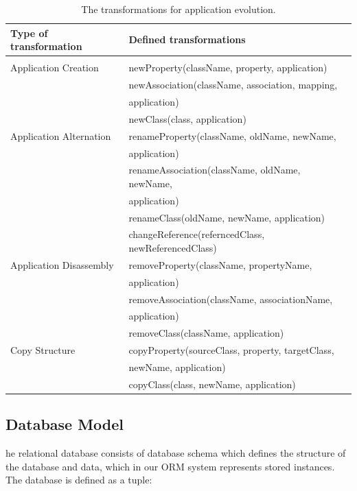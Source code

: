 \documentclass[runningheads]{comsis}
\begin{document}
\begin{table}
\caption{The transformations for application evolution.}
	\label{tab:app-evolution}
\centering
	\begin{tabular}{ll}
	\hline
	Type of transformation & Defined transformations \\
	\hline
	\\[-2ex] 
	Application Creation
	& newProperty(className, property, application) \\
	& newAssociation(className, association, mapping, \\ &  \hspace{0.5in}application) \\
	&  newClass(class, application) \\
	Application Alternation
		& renameProperty(className, oldName, newName, \\ &  \hspace{0.5in} application) \\
		& renameAssociation(className, oldName, newName, \\ &  \hspace{0.5in}application) \\
		& renameClass(oldName, newName, application)\\
		& changeReference(referncedClass, newReferencedClass) \\
	Application Disassembly 
		& removeProperty(className, propertyName,\\ &  \hspace{0.5in} application) \\
		& removeAssociation(className, associationName, \\ &  \hspace{0.5in}application) \\
		& removeClass(className, application)\\
	Copy Structure
		& copyProperty(sourceClass, property, targetClass,\\ &  \hspace{0.5in} newName, application)  \\
		& copyClass(class, newName, application) \\
	\hline
	\end{tabular}
	
\end{table}

\subsection{Database Model}
he relational database consists of database schema which defines the structure of the database and data, which in our ORM system represents stored instances. The database is defined as a tuple:
\end{document}
